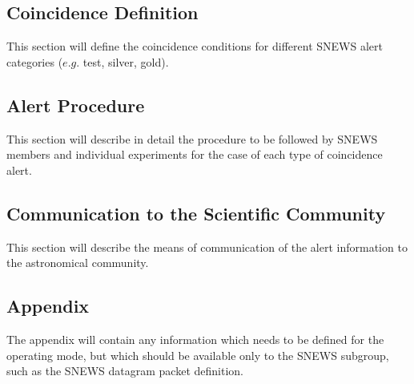\documentclass{article}
\begin{document}
\subsection{Coincidence Definition}

This section will define the coincidence conditions for different
SNEWS alert categories ($e.g.$ test, silver, gold).

\subsection{Alert Procedure}

This section will describe in detail the procedure to be followed by
SNEWS members and individual experiments for the case of each type of
coincidence alert.

\subsection{Communication to the Scientific Community}

This section will describe the means of communication
of the alert information to the astronomical community.

\subsection{Appendix}

The appendix will contain any information which needs to be defined
for the operating mode, but which should be available only
to the SNEWS subgroup, such as the SNEWS datagram packet definition.
\end{document}
